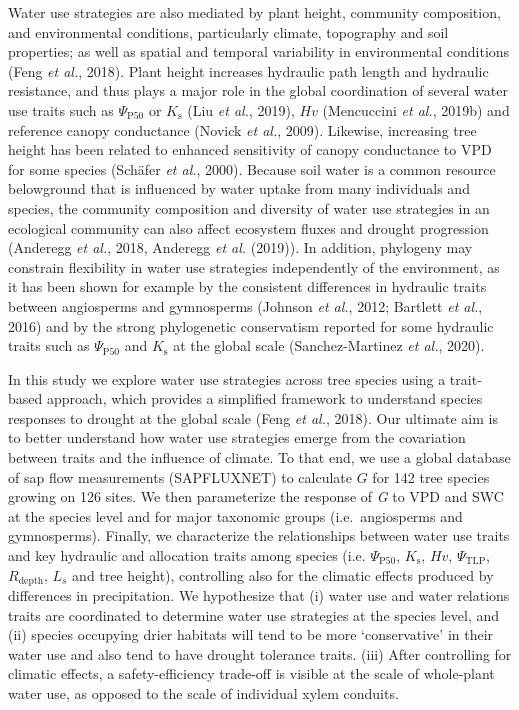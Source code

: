 \documentclass[11pt,twoside]{reedthesis}
\begin{document}
Water use strategies are also mediated by plant height, community
composition, and environmental conditions, particularly climate,
topography and soil properties; as well as spatial and temporal
variability in environmental conditions (Feng \emph{et al.}, 2018).
Plant height increases hydraulic path length and hydraulic resistance,
and thus plays a major role in the global coordination of several water
use traits such as \(\Psi_{\text{P50}}\) or \(K_\text{s}\) (Liu \emph{et
al.}, 2019), \(Hv\) (Mencuccini \emph{et al.}, 2019b) and reference
canopy conductance (Novick \emph{et al.}, 2009). Likewise, increasing
tree height has been related to enhanced sensitivity of canopy
conductance to VPD for some species (Schäfer \emph{et al.}, 2000).
Because soil water is a common resource belowground that is influenced
by water uptake from many individuals and species, the community
composition and diversity of water use strategies in an ecological
community can also affect ecosystem fluxes and drought progression
(Anderegg \emph{et al.}, 2018, Anderegg \emph{et al.} (2019)). In
addition, phylogeny may constrain flexibility in water use strategies
independently of the environment, as it has been shown for example by
the consistent differences in hydraulic traits between angiosperms and
gymnosperms (Johnson \emph{et al.}, 2012; Bartlett \emph{et al.}, 2016)
and by the strong phylogenetic conservatism reported for some hydraulic
traits such as \(\Psi_{\text{P50}}\) and \(K_\text{s}\) at the global
scale (Sanchez-Martinez \emph{et al.}, 2020).\par

In this study we explore water use strategies across tree species using
a trait-based approach, which provides a simplified framework to
understand species responses to drought at the global scale (Feng
\emph{et al.}, 2018). Our ultimate aim is to better understand how water
use strategies emerge from the covariation between traits and the
influence of climate. To that end, we use a global database of sap flow
measurements (SAPFLUXNET) to calculate \(G\) for 142 tree species
growing on 126 sites. We then parameterize the response of \emph{G} to
VPD and SWC at the species level and for major taxonomic groups
(i.e.~angiosperms and gymnosperms). Finally, we characterize the
relationships between water use traits and key hydraulic and allocation
traits among species (i.e. \(\Psi_{\text{P50}}\), \(K_\text{s}\),
\(Hv\), \(\Psi_{\text{TLP}}\), \(R_{\text{depth}}\), \(L_s\) and tree
height), controlling also for the climatic effects produced by
differences in precipitation. We hypothesize that (i) water use and
water relations traits are coordinated to determine water use strategies
at the species level, and (ii) species occupying drier habitats will
tend to be more `conservative' in their water use and also tend to have
drought tolerance traits. (iii) After controlling for climatic effects,
a safety-efficiency trade-off is visible at the scale of whole-plant
water use, as opposed to the scale of individual xylem conduits.\par
\end{document}

